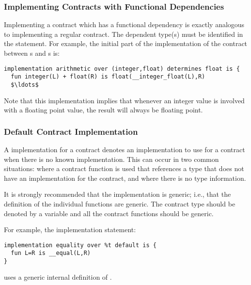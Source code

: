 \subsubsection{Implementing Contracts with Functional Dependencies}
\label{implContractFunctionalDependency}

Implementing a contract which has a functional dependency is exactly analogous to implementing a regular contract. The dependent type(s) must be identified in the  statement. For example, the initial part of the implementation of the  contract between s and s is:
\begin{lstlisting}[mathescape=true]
implementation arithmetic over (integer,float) determines float is {
  fun integer(L) + float(R) is float(__integer_float(L),R)
  $\ldots$
\end{lstlisting}
Note that this implementation implies that whenever an integer value is involved with a floating point value, the result will always be floating point.

\subsubsection{Default Contract Implementation}
\label{defaultImplementation}

A  implementation for a contract denotes an implementation to use for a contract when there is no known implementation. This can occur in two common situations: where a contract function is used that references a type that does not have an implementation for the contract, and where there is no type information.

\begin{aside}
It is strongly recommended that the  implementation is generic; i.e., that the definition of the individual functions are generic. The contract type should be denoted by a variable and all the contract functions should be generic.

For example, the implementation statement:
\begin{lstlisting}
implementation equality over %t default is {
  fun L=R is __equal(L,R)
}
\end{lstlisting}
uses a generic internal definition of .
\end{aside}

